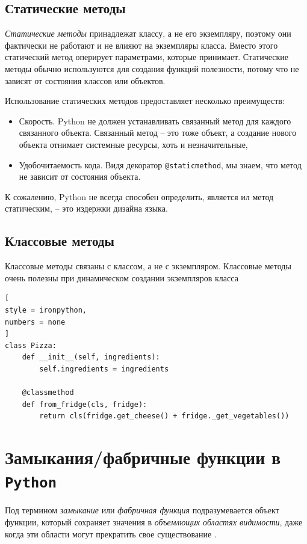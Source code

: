 \documentclass[%
	11pt,
	a4paper,
	utf8,
		]{article}
\begin{document}
\subsection{Статические методы}

\emph{Статические методы} принадлежат классу, а не его экземпляру, поэтому они фактически не работают и не влияют на экземпляры класса. Вместо этого статический метод оперирует параметрами, которые принимает. Статические методы обычно используются для создания функций полезности, потому что не зависят от состояния классов или объектов.

Использование статических методов предоставляет несколько преимуществ:
\begin{itemize}
	\item Скорость. Python не должен устанавливать связанный метод для каждого связанного объекта. Связанный метод -- это тоже объект, а создание нового объекта отнимает системные ресурсы, хоть и незначительные,
	
	\item Удобочитаемость кода. Видя декоратор \verb|@staticmethod|, мы знаем, что метод не зависит от состояния объекта.
\end{itemize}

К сожалению, Python не всегда способен определить, является ил метод статическим, -- это издержки дизайна языка.

\subsection{Классовые методы}

Классовые методы связаны с классом, а не с экземпляром. Классовые методы очень полезны при динамическом создании экземпляров класса
\begin{lstlisting}[
style = ironpython,
numbers = none	
]
class Pizza:
    def __init__(self, ingredients):
        self.ingredients = ingredients
        
    @classmethod
    def from_fridge(cls, fridge):
        return cls(fridge.get_cheese() + fridge._get_vegetables())
\end{lstlisting}


\section{Замыкания/фабричные функции в \texttt{Python}}

Под термином \emph{замыкание} или \emph{фабричная функция} подразумевается объект функции, который сохраняет значения в \emph{объемлющих областях видимости}, даже когда эти области могут прекратить свое существование \cite[]{lutz:learningpython-2011}.
\end{document}
